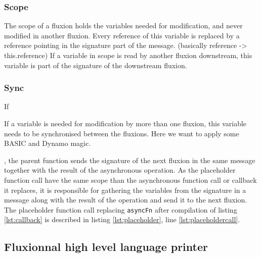 \subsubsection{Scope}

  The scope of a fluxion holds the variables needed for modification, and never modified in another fluxion.
  Every reference of this variable is replaced by a reference pointing in the signature part of the message.
  (basically reference -> this.reference)
  If a variable in scope is read by another fluxion downstream, this variable is part of the signature of the downstream fluxion.

\subsubsection{Sync}

  If 

  If a variable is needed for modification by more than one fluxion, this variable needs to be synchronised between the fluxions.
  Here we want to apply some BASIC and Dynamo magic.



, the parent function sends the signature of the next fluxion in the same message together with the result of the asynchronous operation.
As the placeholder function call have the same scope than the asynchronous function call or callback it replaces, it is responsible for gathering the variables from the signature in a message along with the result of the operation and send it to the next fluxion.
The placeholder function call replacing \texttt{asyncFn} after compilation of listing \ref{lst:callback} is described in listing \ref{lst:placeholder}, line \ref{lst:placeholdercall}.









\subsection{Fluxionnal high level language printer}






